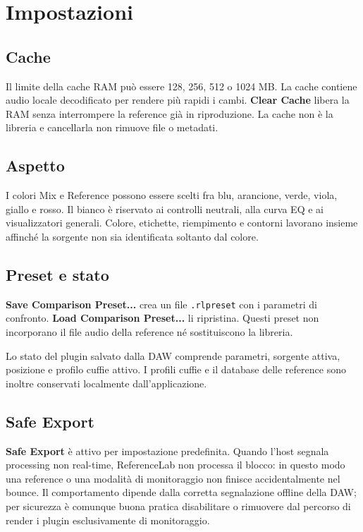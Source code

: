 \documentclass[11pt,a4paper]{article}
\newcommand{\control}[1]{\textbf{\textsf{#1}}}
\begin{document}
\section{Impostazioni}

\subsection{Cache}

Il limite della cache RAM può essere 128, 256, 512 o 1024 MB. La cache contiene
audio locale decodificato per rendere più rapidi i cambi. \control{Clear Cache}
libera la RAM senza interrompere la reference già in riproduzione. La cache non
è la libreria e cancellarla non rimuove file o metadati.

\subsection{Aspetto}

I colori Mix e Reference possono essere scelti fra blu, arancione, verde,
viola, giallo e rosso. Il bianco è riservato ai controlli neutrali, alla curva
EQ e ai visualizzatori generali. Colore, etichette, riempimento e contorni
lavorano insieme affinché la sorgente non sia identificata soltanto dal colore.

\subsection{Preset e stato}

\control{Save Comparison Preset...} crea un file \texttt{.rlpreset} con i
parametri di confronto. \control{Load Comparison Preset...} li ripristina.
Questi preset non incorporano il file audio della reference né sostituiscono
la libreria.

Lo stato del plugin salvato dalla DAW comprende parametri, sorgente attiva,
posizione e profilo cuffie attivo. I profili cuffie e il database delle
reference sono inoltre conservati localmente dall'applicazione.

\subsection{Safe Export}

\control{Safe Export} è attivo per impostazione predefinita. Quando l'host
segnala processing non real-time, ReferenceLab non processa il blocco: in
questo modo una reference o una modalità di monitoraggio non finisce
accidentalmente nel bounce. Il comportamento dipende dalla corretta
segnalazione offline della DAW; per sicurezza è comunque buona pratica
disabilitare o rimuovere dal percorso di render i plugin esclusivamente di
monitoraggio.
\end{document}
